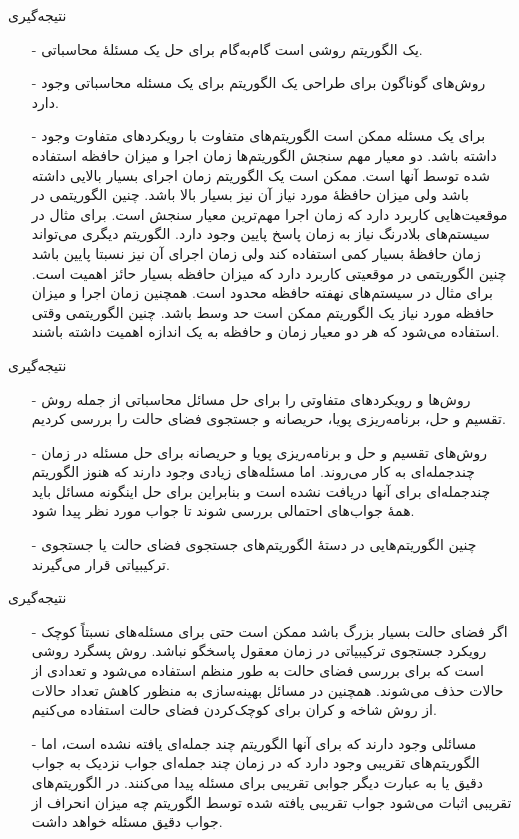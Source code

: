 
\begin{frame}{نتیجه‌گیری}
\begin{itemize}\itemr
\item[-]
یک الگوریتم روشی است گام‌به‌گام برای حل یک مسئلهٔ محاسباتی.
\item[-]
روش‌های گوناگون برای طراحی یک الگوریتم برای یک مسئله محاسباتی وجود دارد.
\item[-]
برای یک مسئله ممکن است الگوریتم‌های متفاوت با رویکردهای متفاوت وجود داشته باشد. دو معیار مهم سنجش الگوریتم‌ها زمان اجرا و میزان حافظه استفاده شده توسط آنها است. ممکن است یک الگوریتم زمان اجرای بسیار بالایی داشته باشد ولی میزان حافظهٔ مورد نیاز آن نیز بسیار بالا باشد. چنین الگوریتمی در موقعیت‌هایی کاربرد دارد که زمان اجرا مهم‌ترین معیار سنجش است.
برای مثال در سیستم‌های بلادرنگ نیاز به زمان پاسخ پایین وجود دارد.
 الگوریتم دیگری می‌تواند زمان حافظهٔ بسیار کمی استفاده کند ولی زمان اجرای آن نیز نسبتا پایین باشد چنین الگوریتمی در موقعیتی کاربرد دارد که میزان حافظه بسیار حائز اهمیت است. برای مثال در سیستم‌های نهفته حافظه محدود است. همچنین زمان اجرا و میزان حافظه مورد نیاز یک الگوریتم ممکن است حد وسط باشد. چنین الگوریتمی وقتی استفاده می‌شود که هر دو معیار زمان و حافظه به یک اندازه اهمیت داشته باشند.
\end{itemize}
\end{frame}


\begin{frame}{نتیجه‌گیری}
\begin{itemize}\itemr
\item[-]
روش‌ها و رویکردهای متفاوتی را برای حل مسائل محاسباتی از جمله روش تقسیم و حل، برنامه‌ریزی پویا، حریصانه و جستجوی فضای حالت را بررسی کردیم.
\item[-]
روش‌های تقسیم و حل و برنامه‌ریزی پویا و حریصانه برای حل مسئله در زمان چندجمله‌ای به کار می‌روند. اما مسئله‌های زیادی وجود دارند که هنوز الگوریتم چندجمله‌ای برای آنها دریافت نشده است و بنابراین برای حل اینگونه مسائل باید همهٔ جواب‌های احتمالی بررسی شوند تا جواب مورد نظر پیدا شود.
\item[-]
چنین الگوریتم‌هایی در دستهٔ الگوریتم‌های جستجوی فضای حالت یا جستجوی ترکیبیاتی قرار می‌گیرند.
\end{itemize}
\end{frame}


\begin{frame}{نتیجه‌گیری}
\begin{itemize}\itemr
\item[-]
 اگر فضای حالت بسیار بزرگ باشد ممکن است حتی برای مسئله‌های نسبتاً کوچک رویکرد جستجوی ترکیبیاتی در زمان معقول پاسخگو نباشد.
 روش پسگرد روشی است که برای بررسی فضای حالت به طور منظم استفاده می‌شود و تعدادی از حالات حذف می‌شوند.
همچنین در مسائل بهینه‌سازی به منظور کاهش تعداد حالات از روش شاخه و کران برای کوچک‌کردن فضای حالت استفاده می‌کنیم.
\item[-]
مسائلی وجود دارند که برای آنها الگوریتم چند جمله‌ای یافته نشده است، اما الگوریتم‌های تقریبی وجود دارد که در زمان چند جمله‌ای جواب نزدیک به جواب دقیق یا به عبارت دیگر جوابی تقریبی برای مسئله پیدا می‌کنند. در الگوریتم‌های تقریبی اثبات می‌شود جواب تقریبی یافته شده توسط الگوریتم چه میزان انحراف از جواب دقیق مسئله خواهد داشت.
\end{itemize}
\end{frame}
